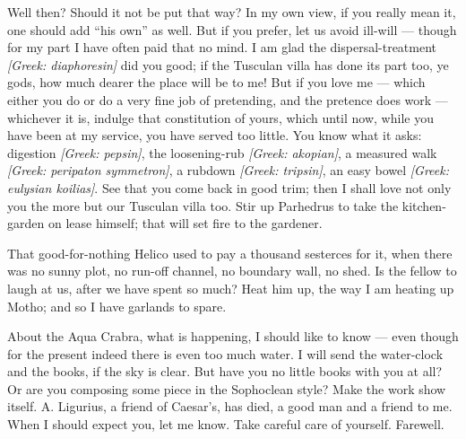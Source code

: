 

 Well then? Should it not be put that way? In my own view, if you really mean it, one should add ``his own'' as well. But if you prefer, let us avoid ill-will --- though for my part I have often paid that no mind. I am glad the dispersal-treatment \textit{[Greek: diaphoresin]} did you good; if the Tusculan villa has done its part too, ye gods, how much dearer the place will be to me! But if you love me --- which either you do or do a very fine job of pretending, and the pretence does work --- whichever it is, indulge that constitution of yours, which until now, while you have been at my service, you have served too little. You know what it asks: digestion \textit{[Greek: pepsin]}, the loosening-rub \textit{[Greek: akopian]}, a measured walk \textit{[Greek: peripaton symmetron]}, a rubdown \textit{[Greek: tripsin]}, an easy bowel \textit{[Greek: eulysian koilias]}. See that you come back in good trim; then I shall love not only you the more but our Tusculan villa too. Stir up Parhedrus to take the kitchen-garden on lease himself; that will set fire to the gardener.

 That good-for-nothing Helico used to pay a thousand sesterces for it, when there was no sunny plot, no run-off channel, no boundary wall, no shed. Is the fellow to laugh at us, after we have spent so much? Heat him up, the way I am heating up Motho; and so I have garlands to spare.

 About the Aqua Crabra, what is happening, I should like to know --- even though for the present indeed there is even too much water. I will send the water-clock and the books, if the sky is clear. But have you no little books with you at all? Or are you composing some piece in the Sophoclean style? Make the work show itself. A. Ligurius, a friend of Caesar's, has died, a good man and a friend to me. When I should expect you, let me know. Take careful care of yourself. Farewell.
